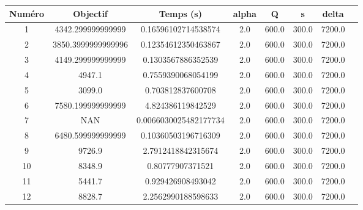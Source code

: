 \begin{tabular}{|c|c|c|c|c|c|c|c|}
\hline
 Numéro & Objectif & Temps (s) & alpha & Q & s & delta \\
\hline
1 & 4342.299999999999 & 0.16596102714538574 & 2.0 & 600.0 & 300.0 & 7200.0 \\ 
 \hline
2 & 3850.3999999999996 & 0.12354612350463867 & 2.0 & 600.0 & 300.0 & 7200.0 \\ 
 \hline
3 & 4149.299999999999 & 0.1303567886352539 & 2.0 & 600.0 & 300.0 & 7200.0 \\ 
 \hline
4 & 4947.1 & 0.7559390068054199 & 2.0 & 600.0 & 300.0 & 7200.0 \\ 
 \hline
5 & 3099.0 & 0.703812837600708 & 2.0 & 600.0 & 300.0 & 7200.0 \\ 
 \hline
6 & 7580.199999999999 & 4.824386119842529 & 2.0 & 600.0 & 300.0 & 7200.0 \\ 
 \hline
7 & NAN & 0.0066030025482177734 & 2.0 & 600.0 & 300.0 & 7200.0 \\ 
 \hline
8 & 6480.599999999999 & 0.10360503196716309 & 2.0 & 600.0 & 300.0 & 7200.0 \\ 
 \hline
9 & 9726.9 & 2.7912418842315674 & 2.0 & 600.0 & 300.0 & 7200.0 \\ 
 \hline
10 & 8348.9 & 0.80777907371521 & 2.0 & 600.0 & 300.0 & 7200.0 \\ 
 \hline
11 & 5441.7 & 0.929426908493042 & 2.0 & 600.0 & 300.0 & 7200.0 \\ 
 \hline
12 & 8828.7 & 2.2562990188598633 & 2.0 & 600.0 & 300.0 & 7200.0 \\ 
 \hline
\end{tabular}
